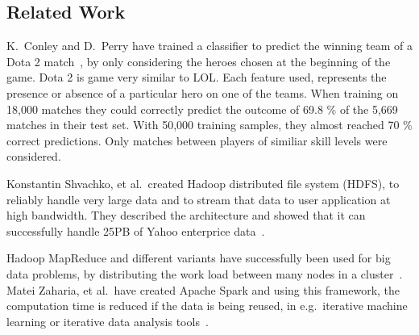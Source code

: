 \subsection{Related Work}\label{sec:relatedwork}
K.\ Conley and D.\ Perry have trained a classifier to predict the winning team of a Dota 2 match~\cite{dota2article}, by only considering the heroes chosen at the beginning of the game. Dota 2 is game very similar to LOL.\@
Each feature used, represents the presence or absence of a particular hero on one of the teams.
When training on 18,000 matches they could correctly predict the outcome of 69.8 \% of the 5,669 matches in their test set.
With 50,000 training samples, they almost reached 70 \% correct predictions. Only matches between players of similiar skill levels were considered.

Konstantin Shvachko, et al.\, created Hadoop distributed file system (HDFS), to reliably handle very large data and to stream that data to user application at high bandwidth. They described the architecture and showed that it can successfully handle 25PB of Yahoo enterprice data~\cite{HDFS}.

Hadoop MapReduce and different variants have successfully been used for big data problems, by distributing the work load between many nodes in a cluster~\cite{DeanMapReduce}. 
Matei Zaharia, et al.\ have created Apache Spark and using this framework, the computation time is reduced if the data is being reused, in e.g.\ iterative machine learning or iterative data analysis tools~\cite{ApacheSpark}. 



